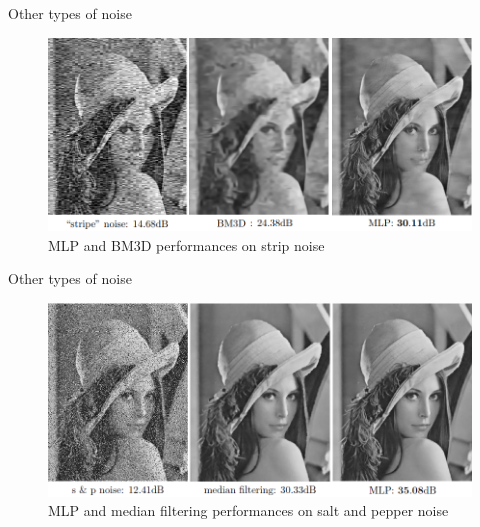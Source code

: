 \documentclass[8pt]{beamer}
\begin{document}
\begin{frame}{Other types of noise}

\begin{figure}[H]
    \begin{center}
        \includegraphics[scale=0.45]{../datasets/images/stripnoise.png}
        \caption{MLP and BM3D performances on strip noise}
    \end{center}
\end{figure}
\end{frame}



\begin{frame}{Other types of noise}
\begin{figure}[H]
    \begin{center}
        \includegraphics[scale=0.45]{../datasets/images/saltandpeppernoise.png}
        \caption{MLP and median filtering performances on salt and pepper noise}
    \end{center}
\end{figure}

\end{frame}
\end{document}
